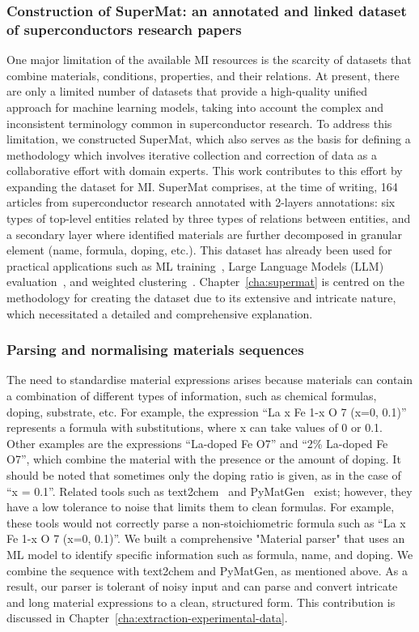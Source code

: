 \subsubsection{Construction of SuperMat: an annotated and linked dataset of superconductors research papers}
\label{sec:intro-supermat}
One major limitation of the available MI resources is the scarcity of datasets that combine materials, conditions, properties, and their relations. At present, there are only a limited number of datasets that provide a high-quality unified approach for machine learning models, taking into account the complex and inconsistent terminology common in superconductor research.
To address this limitation, we constructed SuperMat, which also serves as the basis for defining a methodology which involves iterative collection and correction of data as a collaborative effort with domain experts. This work contributes to this effort by expanding the dataset for MI.
SuperMat comprises, at the time of writing, 164 articles from superconductor research annotated with 2-layers annotations: six types of top-level entities related by three types of relations between entities, and a secondary layer where identified materials are further decomposed in granular element (name, formula, doping, etc.).
This dataset has already been used for practical applications such as ML training~\cite{foppiano2023automatic}, Large Language Models (LLM) evaluation~\cite{foppiano2024mining}, and weighted clustering~\cite{dieb2022superconductor}. 
Chapter~\ref{cha:supermat} is centred on the methodology for creating the dataset due to its extensive and intricate nature, which necessitated a detailed and comprehensive explanation.

\subsubsection{Parsing and normalising materials sequences}
\label{sec:intro-material-parser}

The need to standardise material expressions arises because materials can contain a combination of different types of information, such as chemical formulas, doping, substrate, etc. For example, the expression ``La x Fe 1-x O 7 (x=0, 0.1)'' represents a formula with substitutions, where x can take values of 0 or 0.1. 
Other examples are the expressions ``La-doped Fe O7'' and ``2\% La-doped Fe O7'', which combine the material with the presence or the amount of doping. It should be noted that sometimes only the doping ratio is given, as in the case of ``x = 0.1''. 
Related tools such as text2chem~\cite{kononova2019text} and PyMatGen~\cite{Ong2013} exist; however, they have a low tolerance to noise that limits them to clean formulas. 
For example, these tools would not correctly parse a non-stoichiometric formula such as ``La x Fe 1-x O 7 (x=0, 0.1)''. 
We built a comprehensive "Material parser" that uses an ML model to identify specific information such as formula, name, and doping. We combine the sequence with text2chem and PyMatGen, as mentioned above. 
As a result, our parser is tolerant of noisy input and can parse and convert intricate and long material expressions to a clean, structured form. 
This contribution is discussed in Chapter~\ref{cha:extraction-experimental-data}.


